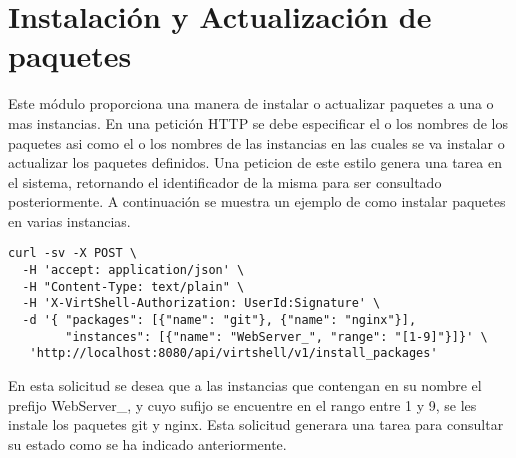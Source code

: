 \section{Instalación y Actualización de paquetes}
Este módulo proporciona una manera de instalar o actualizar paquetes a una o mas instancias. En una petición HTTP se debe especificar el o los nombres de los paquetes asi como el o los nombres de las instancias en las cuales se va instalar o actualizar los paquetes definidos. Una peticion de este estilo genera una tarea en el sistema, retornando el identificador de la misma para ser consultado posteriormente. A continuación se muestra un ejemplo de como instalar paquetes en varias instancias.

\vspace{5mm}

\begin{lstlisting}[style=json, caption=Petición HTTP para instalar paquetes en las instancias]
curl -sv -X POST \
  -H 'accept: application/json' \
  -H "Content-Type: text/plain" \
  -H 'X-VirtShell-Authorization: UserId:Signature' \
  -d '{ "packages": [{"name": "git"}, {"name": "nginx"}],
        "instances": [{"name": "WebServer_", "range": "[1-9]"}]}' \
   'http://localhost:8080/api/virtshell/v1/install_packages'
\end{lstlisting}

\vspace{5mm}

En esta solicitud se desea que a las instancias que contengan en su nombre el prefijo WebServer\_, y cuyo sufijo se encuentre en el rango entre 1 y 9, se les instale los paquetes git y nginx. Esta solicitud generara una tarea para consultar su estado como se ha indicado anteriormente.